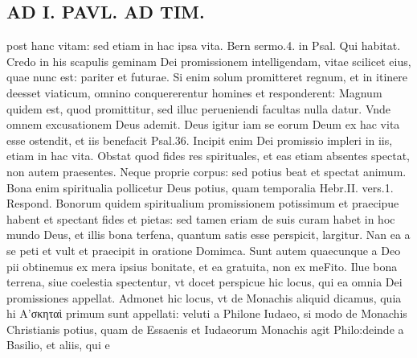 \documentclass{article}
\begin{document}
\begin{pages}
\section*{AD I. PAVL. AD TIM. }
\marginpar{[ p.212 ]}\pstart post hanc vitam: sed etiam in hac ipsa vita. Bern sermo.4. in Psal. Qui habitat. Credo in his scapulis geminam Dei promissionem intelligendam, vitae scilicet eius, quae nunc est: pariter et futurae. Si enim solum promitteret regnum, et in itinere deesset viaticum, omnino conquererentur homines et responderent: Magnum quidem est, quod promittitur, sed illuc perueniendi facultas nulla datur. Vnde omnem excusationem Deus ademit. Deus igitur iam se eorum Deum ex hac vita esse ostendit, et iis benefacit Psal.36. Incipit enim Dei promissio impleri in iis, etiam in hac vita. Obstat quod fides res spirituales, et eas etiam absentes spectat, non autem praesentes. Neque proprie corpus: sed potius beat et spectat animum. Bona enim spiritualia pollicetur Deus potius, quam temporalia Hebr.II. vers.1. Respond. Bonorum quidem spiritualium promissionem potissimum et praecipue habent et spectant fides et pietas: sed tamen eriam de suis curam habet in hoc mundo Deus, et illis bona terfena, quantum satis esse perspicit, largitur. Nan ea a se peti et vult et praecipit in oratione Domimca. Sunt autem quaecunque a Deo pii obtinemus ex mera ipsius bonitate, et ea gratuita, non ex meFito. Ilue bona terrena, siue coelestia spectentur, vt docet perspicue hic locus, qui ea omnia Dei promissiones appellat. Admonet hic locus, vt de Monachis aliquid dicamus, quia hi Α'σκηταὶ primum sunt appellati: veluti a Philone Iudaeo, si modo de Monachis Christianis potius, quam de Essaenis et Iudaeorum Monachis agit Philo:deinde a Basilio, et aliis, qui e\pend

\end{pages}
\end{document}

